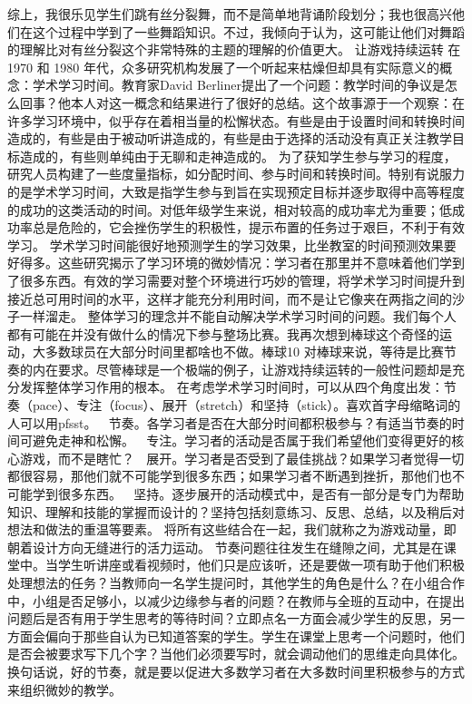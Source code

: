 综上，我很乐见学生们跳有丝分裂舞，而不是简单地背诵阶段划分；我也很高兴他们在这个过程中学到了一些舞蹈知识。不过，我倾向于认为，这可能让他们对舞蹈的理解比对有丝分裂这个非常特殊的主题的理解的价值更大。
让游戏持续运转
在1970 和 1980 年代，众多研究机构发展了一个听起来枯燥但却具有实际意义的概念：学术学习时间。教育家David Berliner提出了一个问题：教学时间的争议是怎么回事？他本人对这一概念和结果进行了很好的总结。这个故事源于一个观察：在许多学习环境中，似乎存在着相当量的松懈状态。有些是由于设置时间和转换时间造成的，有些是由于被动听讲造成的，有些是由于选择的活动没有真正关注教学目标造成的，有些则单纯由于无聊和走神造成的。
为了获知学生参与学习的程度，研究人员构建了一些度量指标，如分配时间、参与时间和转换时间。特别有说服力的是学术学习时间，大致是指学生参与到旨在实现预定目标并逐步取得中高等程度的成功的这类活动的时间。对低年级学生来说，相对较高的成功率尤为重要；低成功率总是危险的，它会挫伤学生的积极性，提示布置的任务过于艰巨，不利于有效学习。
学术学习时间能很好地预测学生的学习效果，比坐教室的时间预测效果要好得多。这些研究揭示了学习环境的微妙情况：学习者在那里并不意味着他们学到了很多东西。有效的学习需要对整个环境进行巧妙的管理，将学术学习时间提升到接近总可用时间的水平，这样才能充分利用时间，而不是让它像夹在两指之间的沙子一样溜走。
整体学习的理念并不能自动解决学术学习时间的问题。我们每个人都有可能在并没有做什么的情况下参与整场比赛。我再次想到棒球这个奇怪的运动，大多数球员在大部分时间里都啥也不做。棒球10%
对棒球来说，等待是比赛节奏的内在要求。尽管棒球是一个极端的例子，让游戏持续运转的一般性问题却是充分发挥整体学习作用的根本。
在考虑学术学习时间时，可以从四个角度出发：节奏（pace）、专注（focus）、展开（stretch）和坚持（stick）。喜欢首字母缩略词的人可以用pfsst。
	节奏。各学习者是否在大部分时间都积极参与？有适当节奏的时间可避免走神和松懈。
	专注。学习者的活动是否属于我们希望他们变得更好的核心游戏，而不是瞎忙？
	展开。学习者是否受到了最佳挑战？如果学习者觉得一切都很容易，那他们就不可能学到很多东西；如果学习者不断遇到挫折，那他们也不可能学到很多东西。
	坚持。逐步展开的活动模式中，是否有一部分是专门为帮助知识、理解和技能的掌握而设计的？坚持包括刻意练习、反思、总结，以及稍后对想法和做法的重温等要素。
将所有这些结合在一起，我们就称之为游戏动量，即朝着设计方向无缝进行的活力运动。
节奏问题往往发生在缝隙之间，尤其是在课堂中。当学生听讲座或看视频时，他们只是应该听，还是要做一项有助于他们积极处理想法的任务？当教师向一名学生提问时，其他学生的角色是什么？在小组合作中，小组是否足够小，以减少边缘参与者的问题？在教师与全班的互动中，在提出问题后是否有用于学生思考的等待时间？立即点名一方面会减少学生的反思，另一方面会偏向于那些自认为已知道答案的学生。学生在课堂上思考一个问题时，他们是否会被要求写下几个字？当他们必须要写时，就会调动他们的思维走向具体化。换句话说，好的节奏，就是要以促进大多数学习者在大多数时间里积极参与的方式来组织微妙的教学。
